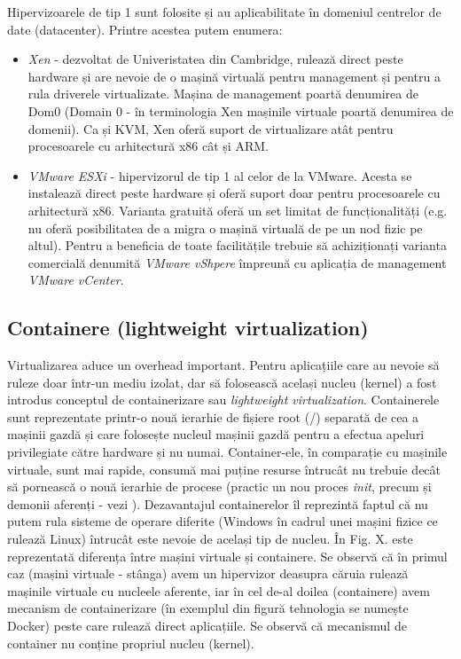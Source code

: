 Hipervizoarele de tip 1 sunt folosite și au aplicabilitate în domeniul centrelor
de date (datacenter). Printre acestea putem enumera:

\begin{itemize}
	\item \textit{Xen} - dezvoltat de Univeristatea din Cambridge, rulează
		direct peste hardware și are nevoie de o mașină virtuală pentru
		management și pentru a rula driverele virtualizate. Mașina de
		management poartă denumirea de Dom0 (Domain 0 - în terminologia
		Xen mașinile virtuale poartă denumirea de domenii). Ca și KVM,
		Xen oferă suport de virtualizare atât pentru procesoarele cu
		arhitectură x86 cât și ARM.
	\item \textit{VMware ESXi} - hipervizorul de tip 1 al celor de la
		VMware. Acesta se instalează direct peste hardware și oferă
		suport doar pentru procesoarele cu arhitectură x86. Varianta
		gratuită oferă un set limitat de funcționalități (e.g. nu oferă
		posibilitatea de a migra o mașină virtuală de pe un nod fizic pe
		altul). Pentru a beneficia de toate facilitățile trebuie să
		achiziționați varianta comercială denumită \textit{VMware
		vShpere} împreună cu aplicația de management \textit{VMware
		vCenter}.
\end{itemize}

\subsection{Containere (lightweight virtualization)}
\label{sec:vm-intro-containers}

Virtualizarea aduce un overhead important. Pentru aplicațiile care au nevoie să
ruleze doar într-un mediu izolat, dar să folosească același nucleu (kernel) a
fost introdus conceptul de containerizare sau \textit{lightweight
virtualization}. Containerele sunt reprezentate printr-o nouă ierarhie de
fișiere root (/) separată de cea a mașinii gazdă și care folosește nucleul
mașinii gazdă pentru a efectua apeluri privilegiate către hardware și nu numai.
Container-ele, în comparație cu mașinile virtuale, sunt mai rapide, consumă mai
puține resurse întrucât nu trebuie decât să pornească o nouă ierarhie de procese
(practic un nou proces \textit{init}, precum și demonii aferenți - vezi
). Dezavantajul containerelor îl
reprezintă faptul că nu putem rula sisteme de operare diferite (Windows în
cadrul unei mașini fizice ce rulează Linux) întrucât este nevoie de același tip
de nucleu. În Fig. X. este reprezentată diferența între mașini virtuale și
containere. Se observă că în primul caz (mașini virtuale - stânga) avem un
hipervizor deasupra căruia rulează mașinile virtuale cu nucleele aferente, iar
în cel de-al doilea (containere) avem mecanism de containerizare (în exemplul
din figură tehnologia se numește Docker) peste care rulează direct aplicațiile.
Se observă că mecanismul de container nu conține propriul nucleu (kernel).

